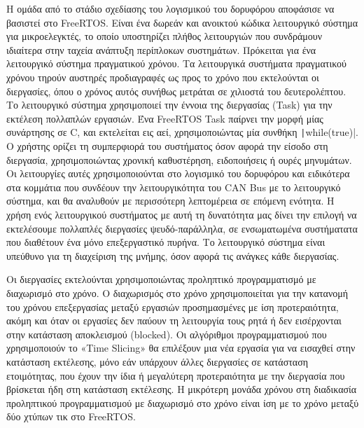 \documentclass[a4paper,nobib,justified]{tufte-book}
\begin{document}

\par Η ομάδα από το στάδιο σχεδίασης του λογισμικού του δορυφόρου αποφάσισε να βασιστεί στο FreeRTOS. Είναι ένα δωρεάν και ανοικτού κώδικα λειτουργικό σύστημα για μικροελεγκτές, το οποίο υποστηρίζει πλήθος λειτουργιών που συνδράμουν ιδιαίτερα στην ταχεία ανάπτυξη περίπλοκων συστημάτων. Πρόκειται για ένα λειτουργικό σύστημα πραγματικού χρόνου. Τα λειτουργικά συστήματα πραγματικού χρόνου τηρούν αυστηρές προδιαγραφές ως προς το χρόνο που εκτελούνται οι διεργασίες, όπου ο χρόνος αυτός συνήθως μετράται σε χιλιοστά του δευτερολέπτου. Το λειτουργικό σύστημα χρησιμοποιεί την έννοια της διεργασίας (Task) για την εκτέλεση πολλαπλών εργασιών. Ένα FreeRTOS Task παίρνει την μορφή μίας συνάρτησης σε C, και εκτελείται εις αεί, χρησιμοποιώντας μία συνθήκη \texttt|while(true)|. Ο χρήστης ορίζει τη συμπερφιορά του συστήματος όσον αφορά την είσοδο στη διεργασία, χρησιμοποιώντας χρονική καθυστέρηση, ειδοποιήσεις ή ουρές μηνυμάτων. Οι λειτουργίες αυτές χρησιμοποιούνται στο λογισμικό του δορυφόρου και ειδικότερα στα κομμάτια που συνδέουν την λειτουργικότητα του CAN Bus με το λειτουργικό σύστημα, και θα αναλυθούν με περισσότερη λεπτομέρεια σε επόμενη ενότητα. Η χρήση ενός λειτουργικού συστήματος με αυτή τη δυνατότητα μας δίνει την επιλογή να εκτελέσουμε πολλαπλές διεργασίες ψευδό-παράλληλα, σε ενσωματωμένα συστήματατα που διαθέτουν ένα μόνο επεξεργαστικό πυρήνα. Το λειτουργικό σύστημα είναι υπεύθυνο για τη διαχείριση της μνήμης, όσον αφορά τις ανάγκες κάθε διεργασίας.

Οι διεργασίες εκτελούνται χρησιμοποιώντας προληπτικό προγραμματισμό με διαχωρισμό στο χρόνο. Ο διαχωρισμός στο χρόνο χρησιμοποιείται για την κατανομή του χρόνου επεξεργασίας μεταξύ εργασιών προσημασμένες με ίση προτεραιότητα, ακόμη και όταν οι εργασίες δεν παύουν τη λειτουργία τους ρητά ή δεν εισέρχονται στην κατάσταση αποκλεισμού (blocked). Οι αλγόριθμοι προγραμματισμού που χρησιμοποιούν το «Time Slicing» θα επιλέξουν μια νέα εργασία για να εισαχθεί στην κατάσταση εκτέλεσης, μόνο εάν υπάρχουν άλλες διεργασίες σε κατάσταση ετοιμότητας, που έχουν την ίδια ή μεγαλύτερη προτεραιότητα με την διεργασία που βρίσκεται ήδη στη κατάσταση εκτέλεσης. Η μικρότερη μονάδα χρόνου στη διαδικασία προληπτικού προγραμματισμού με διαχωρισμό στο χρόνο είναι ίση με το χρόνο μεταξύ δύο χτύπων τικ στο FreeRTOS.
\end{document}
